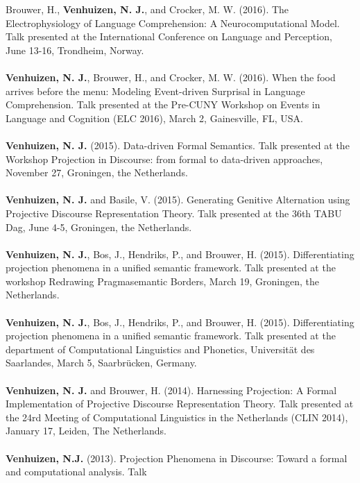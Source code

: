 \documentclass[a4paper,10pt]{article}
\begin{document}
\noindent
    Brouwer, H., \textbf{Venhuizen, N. J.}, and Crocker, M. W. (2016). The
    Electrophysiology of Language Comprehension: A Neurocomputational Model.
    Talk presented at the International Conference on Language and Perception,
    June 13-16, Trondheim, Norway.\\
    \\
    \textbf{Venhuizen, N. J.}, Brouwer, H., and Crocker, M. W. (2016). When the
    food arrives before the menu: Modeling Event-driven Surprisal in Language
    Comprehension. Talk presented at the Pre-CUNY Workshop on Events in
    Language and Cognition (ELC 2016), March 2, Gainesville, FL, USA.\\
    \\
    \textbf{Venhuizen, N. J.} (2015). Data-driven Formal Semantics. Talk
    presented at the Workshop Projection in Discourse: from formal to
    data-driven approaches, November 27, Groningen, the Netherlands.\\
    \\
    \textbf{Venhuizen, N. J.} and Basile, V. (2015). Generating Genitive
    Alternation using Projective Discourse Representation Theory.
    Talk presented at the 36th TABU Dag, June 4-5, Groningen, the Netherlands.\\
    \\
    \textbf{Venhuizen, N. J.}, Bos, J., Hendriks, P., and Brouwer, H. (2015). 
    Differentiating projection phenomena in a unified semantic framework.
    Talk presented at the workshop Redrawing Pragmasemantic Borders,
    March 19, Groningen, the Netherlands.\\
    \\
    \textbf{Venhuizen, N. J.}, Bos, J., Hendriks, P., and Brouwer, H. (2015). 
    Differentiating projection phenomena in a unified semantic framework.
    Talk presented at the department of Computational Linguistics and Phonetics,
    Universit{\"a}t des Saarlandes, March 5, Saarbr{\"u}cken, Germany.\\
    \\
    \textbf{Venhuizen, N. J.} and Brouwer, H. (2014). Harnessing Projection: A Formal
    Implementation of Projective Discourse Representation Theory. Talk
    presented at the 24rd Meeting of Computational Linguistics in the
    Netherlands (CLIN 2014), January 17, Leiden, The Netherlands.\\
    \\
    \textbf{Venhuizen, N.J.} (2013). Projection Phenomena in Discourse: Toward
    a formal and computational analysis. Talk
\end{document}

